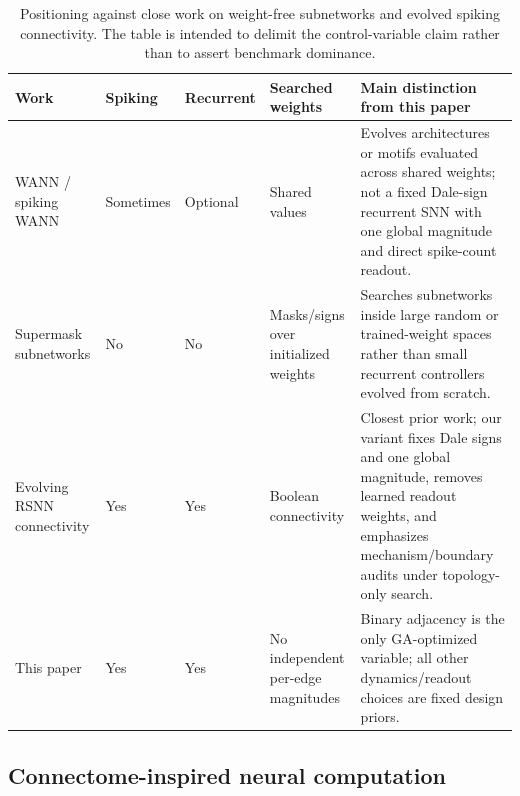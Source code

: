 \documentclass[10pt]{article}
\begin{document}
\begin{table}[H]
\centering
\footnotesize
\begin{tabularx}{\textwidth}{L{0.17\textwidth} L{0.10\textwidth} L{0.10\textwidth} L{0.18\textwidth} Y}
\toprule
\textbf{Work} & \textbf{Spiking} & \textbf{Recurrent} & \textbf{Searched weights} & \textbf{Main distinction from this paper} \\
\midrule
WANN / spiking WANN \citep{gaier2019,anwar2021} & Sometimes & Optional & Shared values & Evolves architectures or motifs evaluated across shared weights; not a fixed Dale-sign recurrent SNN with one global magnitude and direct spike-count readout. \\
Supermask subnetworks \citep{ramanujan2020,zhou2019} & No & No & Masks/signs over initialized weights & Searches subnetworks inside large random or trained-weight spaces rather than small recurrent controllers evolved from scratch. \\
Evolving RSNN connectivity \citep{wang2023} & Yes & Yes & Boolean connectivity & Closest prior work; our variant fixes Dale signs and one global magnitude, removes learned readout weights, and emphasizes mechanism/boundary audits under topology-only search. \\
This paper & Yes & Yes & No independent per-edge magnitudes & Binary adjacency is the only GA-optimized variable; all other dynamics/readout choices are fixed design priors. \\
\bottomrule
\end{tabularx}
\caption{Positioning against close work on weight-free subnetworks and evolved spiking connectivity. The table is intended to delimit the control-variable claim rather than to assert benchmark dominance.}
\label{tab:close-work}
\end{table}

\subsection{Connectome-inspired neural computation}
\end{document}
